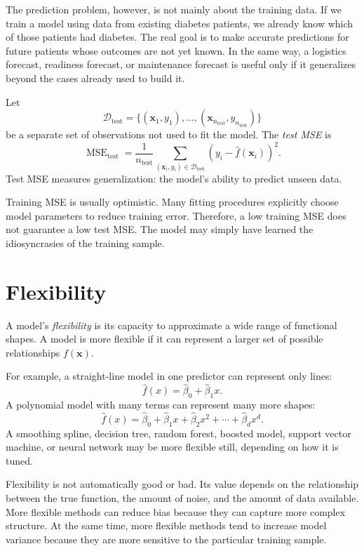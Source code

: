 {The prediction problem, however, is not mainly about the training data.  If we train a model using data from existing diabetes patients, we already know which of those patients had diabetes.  The real goal is to make accurate predictions for future patients whose outcomes are not yet known.  In the same way, a logistics forecast, readiness forecast, or maintenance forecast is useful only if it generalizes beyond the cases already used to build it.

Let
\[
  \mathcal{D}_{\text{test}}
  = \{(\mathbf{x}_1,y_1),\ldots,(\mathbf{x}_{n_{\text{test}}},y_{n_{\text{test}}})\}
\]
be a separate set of observations not used to fit the model.  The \emph{test MSE} is
\begin{equation}
  \operatorname{MSE}_{\text{test}}
  = \frac{1}{n_{\text{test}}}\sum_{(\mathbf{x}_i,y_i)\in \mathcal{D}_{\text{test}}}
  \left(y_i-\hat f(\mathbf{x}_i)\right)^2.
  \label{eq:ch2-test-mse}
\end{equation}
Test MSE measures generalization: the model's ability to predict unseen data.

Training MSE is usually optimistic.  Many fitting procedures explicitly choose model parameters to reduce training error.  Therefore, a low training MSE does not guarantee a low test MSE.  The model may simply have learned the idiosyncrasies of the training sample.

\section{Flexibility}

A model's \emph{flexibility} is its capacity to approximate a wide range of functional shapes.  A model is more flexible if it can represent a larger set of possible relationships $f(\mathbf{x})$.

For example, a straight-line model in one predictor can represent only lines:
\[
  \hat f(x)=\hat\beta_0+\hat\beta_1x.
\]
A polynomial model with many terms can represent many more shapes:
\[
  \hat f(x)=\hat\beta_0+\hat\beta_1x+\hat\beta_2x^2+\cdots+\hat\beta_dx^d.
\]
A smoothing spline, decision tree, random forest, boosted model, support vector machine, or neural network may be more flexible still, depending on how it is tuned.

Flexibility is not automatically good or bad.  Its value depends on the relationship between the true function, the amount of noise, and the amount of data available.  More flexible methods can reduce bias because they can capture more complex structure.  At the same time, more flexible methods tend to increase model variance because they are more sensitive to the particular training sample.

}

